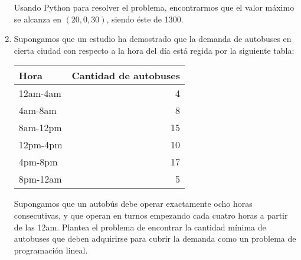 \documentclass[twocolumn]{article}
\begin{document}
\begin{enumerate}
Usando Python para resolver el problema, encontrarmos que el valor
máximo se alcanza en $(20,0,30)$, siendo éste de 1300. 

\item Supongamos que un estudio ha demostrado que la demanda de autobuses
en cierta ciudad con respecto a la hora del día está regida por la
siguiente tabla:
\begin{center}
\begin{tabular}{lr}
Hora & Cantidad de autobuses\\
\hline
12am-4am & 4\\
4am-8am & 8\\
8am-12pm & 15\\
12pm-4pm & 10\\
4pm-8pm & 17\\
8pm-12am & 5\\
\end{tabular}
\end{center}
Supongamos que un autobús debe operar exactamente ocho horas
consecutivas, y que operan en turnos empezando cada cuatro horas a
partir de las 12am. Plantea el problema de encontrar la cantidad
mínima de autobuses que deben adquirirse para cubrir la
demanda como un problema de programación lineal.
\end{enumerate}
\end{document}
